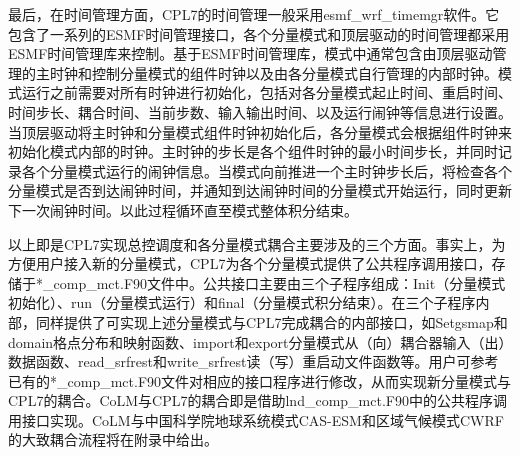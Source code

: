 最后，在时间管理方面，CPL7的时间管理一般采用esmf\_wrf\_timemgr软件。它包含了一系列的ESMF时间管理接口，各个分量模式和顶层驱动的时间管理都采用ESMF时间管理库来控制。基于ESMF时间管理库，模式中通常包含由顶层驱动管理的主时钟和控制分量模式的组件时钟以及由各分量模式自行管理的内部时钟。模式运行之前需要对所有时钟进行初始化，包括对各分量模式起止时间、重启时间、时间步长、耦合时间、当前步数、输入输出时间、以及运行闹钟等信息进行设置。当顶层驱动将主时钟和分量模式组件时钟初始化后，各分量模式会根据组件时钟来初始化模式内部的时钟。主时钟的步长是各个组件时钟的最小时间步长，并同时记录各个分量模式运行的闹钟信息。当模式向前推进一个主时钟步长后，将检查各个分量模式是否到达闹钟时间，并通知到达闹钟时间的分量模式开始运行，同时更新下一次闹钟时间。以此过程循环直至模式整体积分结束。

以上即是CPL7实现总控调度和各分量模式耦合主要涉及的三个方面。事实上，为方便用户接入新的分量模式，CPL7为各个分量模式提供了公共程序调用接口，存储于*\_comp\_mct.F90文件中。公共接口主要由三个子程序组成：Init（分量模式初始化）、run（分量模式运行）和final（分量模式积分结束）。在三个子程序内部，同样提供了可实现上述分量模式与CPL7完成耦合的内部接口，如Setgsmap和domain格点分布和映射函数、import和export分量模式从（向）耦合器输入（出）数据函数、read\_srfrest和write\_srfrest读（写）重启动文件函数等。用户可参考已有的*\_comp\_mct.F90文件对相应的接口程序进行修改，从而实现新分量模式与CPL7的耦合。CoLM与CPL7的耦合即是借助lnd\_comp\_mct.F90中的公共程序调用接口实现。CoLM与中国科学院地球系统模式CAS-ESM和区域气候模式CWRF的大致耦合流程将在附录中给出。
